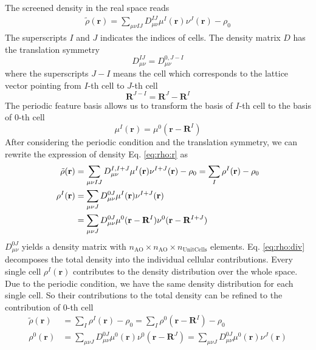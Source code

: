 \documentclass{article}
\begin{document}
The screened density in the real space reads
\begin{align}
  \tilde{\rho}(\mathbf{r}) = \sum_{\mu \nu IJ}D_{\mu\nu}^{IJ}
  \mu^{I}(\mathbf{r})\nu^{J}(\mathbf{r}) - \rho_0
  \label{eq:rho:r}
\end{align}
The superscripts $I$ and $J$ indicates the indices of cells.
The density matrix $D$ has the translation symmetry
\begin{equation}
  D_{\mu\nu}^{IJ} = D_{\mu\nu}^{0,J-I}
  \label{}
\end{equation}
where the superscripts $J-I$ means the cell which corresponds to the lattice
vector pointing from $I$-th cell to $J$-th cell
\begin{equation}
  \mathbf{R}^{J-I} = \mathbf{R}^J - \mathbf{R}^I
  \label{}
\end{equation}
The periodic feature basis allows us to transform the basis of $I$-th cell to
the basis of $0$-th cell
\begin{equation}
  \mu^I(\mathbf{r}) = \mu^0(\mathbf{r}-\mathbf{R}^I)
  \label{}
\end{equation}
After considering the periodic condition and the translation symmetry,
we can rewrite the expression of density Eq. \eqref{eq:rho:r} as
\begin{align}
  \tilde{\rho}(\mathbf{r})
  &=\sum_{\mu\nu IJ}D_{\mu\nu}^{I,I+J}
  \mu^I(\mathbf{r})\nu^{I+J}(\mathbf{r}) - \rho_0
  =\sum_{I} \rho^I(\mathbf{r}) - \rho_0
  \label{eq:rho:div} \\
  \rho^I(\mathbf{r})
  &=\sum_{\mu\nu J}D_{\mu\nu}^{0J}
  \mu^I(\mathbf{r})\nu^{I+J}(\mathbf{r}) \notag\\
  &=\sum_{\mu\nu J}D_{\mu\nu}^{0J}
  \mu^0(\mathbf{r}-\mathbf{R}^I)\nu^0(\mathbf{r}-\mathbf{R}^{I+J})
  \label{eq:rho:ra}
\end{align}
$D_{\mu\nu}^{0J}$ yields a density matrix with
$n_\text{AO} \times n_\text{AO} \times n_\text{UnitCells}$ elements.
Eq. \eqref{eq:rho:div} decomposes the total density into the individual
cellular contributions.
Every single cell $\rho^I(\mathbf{r})$ contributes to the density
distribution over the whole space.
Due to the periodic condition, 
we have the same density distribution for each single cell.
So their contributions to the total density can be refined to the contribution
of $0$-th cell
\begin{align}
  \tilde{\rho}(\mathbf{r})
  &=\sum_{I}\rho^I(\mathbf{r}) - \rho_0
  = \sum_{I}\rho^0(\mathbf{r}-\mathbf{R}^I) - \rho_0
  \label{eq:rho:r0} \\
  \rho^0(\mathbf{r})
  &=\sum_{\mu\nu J}D_{\mu\nu}^{0J}
  \mu^0(\mathbf{r})\nu^0(\mathbf{r}-\mathbf{R}^{J})
  = \sum_{\mu\nu J}D_{\mu\nu}^{0J}
  \mu^0(\mathbf{r})\nu^J(\mathbf{r})
\end{align}
\end{document}
